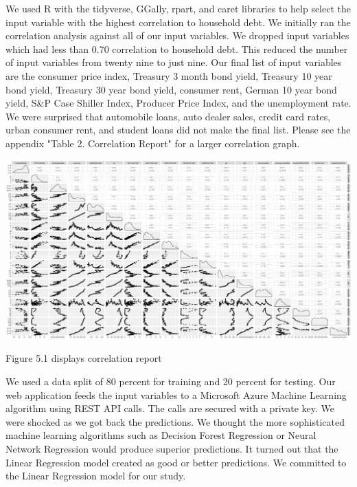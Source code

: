 \documentclass[sigconf,nonacm,11pt]{acmart}
\begin{document}
We used R with the tidyverse, GGally, rpart, and caret libraries to help select the input variable with the highest correlation to household debt. We initially ran the correlation analysis against all of our input variables.   We dropped input variables which had less than 0.70 correlation to household debt. This reduced the number of input variables from twenty nine to just nine. Our final list of input variables are the consumer price index, Treasury 3 month bond yield, Treasury 10 year bond yield, Treasury 30 year bond yield, consumer rent, German 10 year bond yield, S&P Case Shiller Index, Producer Price Index, and the unemployment rate. We were surprised that automobile loans, auto dealer sales, credit card rates, urban consumer rent, and student loans did not make the final list. Please see the appendix "Table 2. Correlation Report" for a larger correlation graph.

\vspace{0.5em}
\includegraphics[scale = 0.10]{teamfedcorrelation.png}

Figure 5.1 displays correlation report
\vspace{0.75em}

We used a data split of 80 percent for training and 20 percent for testing. Our web application feeds the input variables to a Microsoft Azure Machine Learning algorithm using REST API calls. The calls are secured with a private key.  We were shocked as we got back the predictions.  We thought the more sophisticated machine learning algorithms such as Decision Forest Regression or Neural Network Regression would produce  superior predictions. It turned out that the Linear Regression model created as good or better predictions.  We committed to the Linear Regression model for our study.



\vspace{0.5em}
\end{document}
